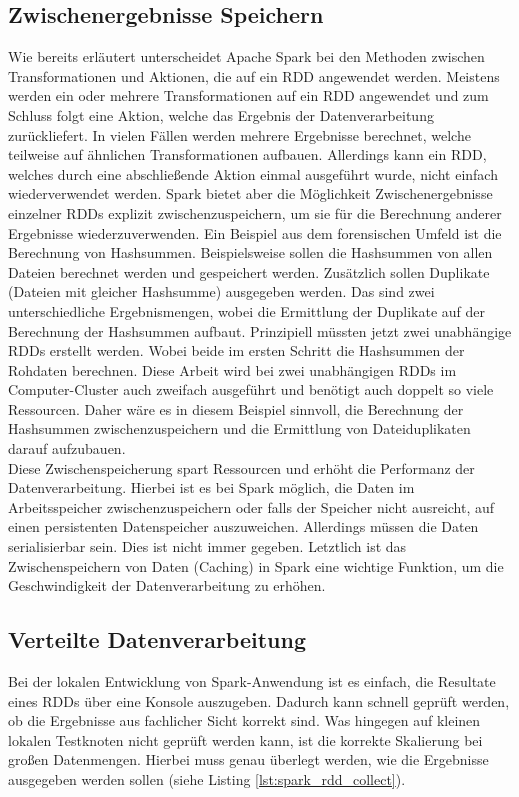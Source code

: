 \subsection*{Zwischenergebnisse Speichern}
Wie bereits erläutert unterscheidet Apache Spark bei den Methoden zwischen Transformationen und Aktionen, die auf ein RDD angewendet werden. Meistens werden ein oder mehrere Transformationen auf ein RDD angewendet und zum Schluss folgt eine Aktion, welche das Ergebnis der Datenverarbeitung zurückliefert. In vielen Fällen werden mehrere Ergebnisse berechnet, welche teilweise auf ähnlichen Transformationen aufbauen. Allerdings kann ein RDD, welches durch eine abschließende Aktion einmal ausgeführt wurde, nicht einfach wiederverwendet werden. Spark bietet aber die Möglichkeit Zwischenergebnisse einzelner RDDs explizit zwischenzuspeichern, um sie für die Berechnung anderer Ergebnisse wiederzuverwenden. Ein Beispiel aus dem forensischen Umfeld ist die Berechnung von Hashsummen. Beispielsweise sollen die Hashsummen von allen Dateien berechnet werden und gespeichert werden. Zusätzlich sollen Duplikate (Dateien mit gleicher Hashsumme) ausgegeben werden. Das sind zwei unterschiedliche Ergebnismengen, wobei die Ermittlung der Duplikate auf der Berechnung der Hashsummen aufbaut. Prinzipiell müssten jetzt zwei unabhängige RDDs erstellt werden. Wobei beide im ersten Schritt die Hashsummen der Rohdaten berechnen. Diese Arbeit wird bei zwei unabhängigen RDDs im Computer-Cluster auch zweifach ausgeführt und benötigt auch doppelt so viele Ressourcen. Daher wäre es in diesem Beispiel sinnvoll, die Berechnung der Hashsummen zwischenzuspeichern und die Ermittlung von Dateiduplikaten darauf aufzubauen.\\
Diese Zwischenspeicherung spart Ressourcen und erhöht die Performanz der Datenverarbeitung. Hierbei ist es bei Spark möglich, die Daten im Arbeitsspeicher zwischenzuspeichern oder falls der Speicher nicht ausreicht, auf einen persistenten Datenspeicher auszuweichen. Allerdings müssen die Daten serialisierbar sein. Dies ist nicht immer gegeben. Letztlich ist das Zwischenspeichern von Daten (Caching) in Spark eine wichtige Funktion, um die Geschwindigkeit der Datenverarbeitung zu erhöhen.\cite{spark_rdd}

\subsection*{Verteilte Datenverarbeitung}
Bei der lokalen Entwicklung von Spark-Anwendung ist es einfach, die Resultate eines RDDs über eine Konsole auszugeben. Dadurch kann schnell geprüft werden, ob die Ergebnisse aus fachlicher Sicht korrekt sind. Was hingegen auf kleinen lokalen Testknoten nicht geprüft werden kann, ist die korrekte Skalierung bei großen Datenmengen. Hierbei muss genau überlegt werden, wie die Ergebnisse ausgegeben werden sollen (siehe Listing \ref{lst:spark_rdd_collect}). 

